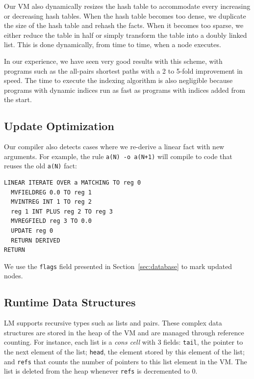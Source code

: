 Our VM also dynamically resizes the hash table to accommodate every increasing or decreasing hash tables. When the hash table becomes
too dense, we duplicate the size of the hash table and rehash the facts. When it becomes too sparse, we either reduce the table in half
or simply transform the table into a doubly linked list. This is done dynamically, from time to time, when a node executes.

In our experience, we have seen very good results with this scheme, with programs such as the all-pairs shortest paths with a 2 to 5-fold
improvement in speed. The time to execute the indexing algorithm is also negligible because programs with dynamic indices run as fast
as programs with indices added from the start.

\subsection{Update Optimization}

Our compiler also detects cases where we re-derive a linear fact with new arguments. For example, the rule \texttt{a(N) -o a(N+1)}
will compile to code that reuses the old \texttt{a(N)} fact:

{\scriptsize

\begin{Verbatim}
LINEAR ITERATE OVER a MATCHING TO reg 0
  MVFIELDREG 0.0 TO reg 1
  MVINTREG INT 1 TO reg 2
  reg 1 INT PLUS reg 2 TO reg 3
  MVREGFIELD reg 3 TO 0.0
  UPDATE reg 0
  RETURN DERIVED
RETURN
\end{Verbatim}
}

We use the \texttt{flags} field presented in Section~\ref{sec:database} to mark updated nodes.

\subsection{Runtime Data Structures}

LM supports recursive types such as lists and pairs. These complex data structures are stored in
the heap of the VM and are managed through reference counting. For instance, each list
is a \emph{cons cell} with 3 fields: \texttt{tail}, the pointer to the next element of the list;
\texttt{head}, the element stored by this element of the list; and \texttt{refs} that counts the
number of pointers to this list element in the VM. The list is deleted from the heap whenever
\texttt{refs} is decremented to 0.